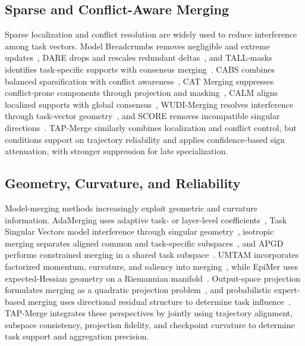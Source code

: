 \documentclass[fleqn,10pt]{wlscirep}
\begin{document}
\subsection{Sparse and Conflict-Aware Merging}
\label{subsec:rw_conflict_merging}

Sparse localization and conflict resolution are widely used to reduce interference among task vectors. Model Breadcrumbs removes negligible and extreme updates~\cite{modelbreadcrumbs2024}, DARE drops and rescales redundant deltas~\cite{dare2024}, and TALL-masks identifies task-specific supports with consensus merging~\cite{tallmasks2024}. CABS combines balanced sparsification with conflict awareness~\cite{cabs2025}, CAT Merging suppresses conflict-prone components through projection and masking~\cite{catmerging2025}, CALM aligns localized supports with global consensus~\cite{calm2025}, WUDI-Merging resolves interference through task-vector geometry~\cite{wudi2025}, and SCORE removes incompatible singular directions~\cite{score2026}. TAP-Merge similarly combines localization and conflict control, but conditions support on trajectory reliability and applies confidence-based sign attenuation, with stronger suppression for late specialization.

\subsection{Geometry, Curvature, and Reliability}
\label{subsec:rw_geometry_merging}

Model-merging methods increasingly exploit geometric and curvature information. AdaMerging uses adaptive task- or layer-level coefficients~\cite{adamerging2024}, Task Singular Vectors model interference through singular geometry~\cite{tsvmerge2025}, isotropic merging separates aligned common and task-specific subspaces~\cite{isotropicmerging2025}, and APGD performs constrained merging in a shared task subspace~\cite{apgdmerging2025}. UMTAM incorporates factorized momentum, curvature, and saliency into merging~\cite{umtam2026}, while EpiMer uses expected-Hessian geometry on a Riemannian manifold~\cite{epimer2026}. Output-space projection formulates merging as a quadratic projection problem~\cite{outputprojection2026}, and probabilistic expert-based merging uses directional residual structure to determine task influence~\cite{poemerging2026}. TAP-Merge integrates these perspectives by jointly using trajectory alignment, subspace consistency, projection fidelity, and checkpoint curvature to determine task support and aggregation precision.
\end{document}
